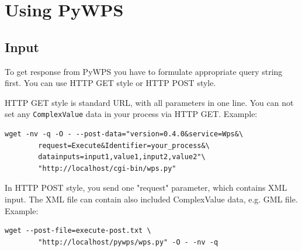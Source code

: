\documentclass[a4paper,11pt]{article}
\begin{document}
\section{Using PyWPS}
\subsection{Input}
    
To get response from PyWPS you have to formulate appropriate query string first. You can use HTTP GET style or HTTP POST style.
    
    
HTTP GET style is standard URL, with all parameters in one line. You can not set any \texttt{ComplexValue} data in your process via HTTP GET. Example:
    
\begin{verbatim}
wget -nv -q -O - --post-data="version=0.4.0&service=Wps&\
        request=Execute&Identifier=your_process&\
        datainputs=input1,value1,input2,value2"\
        "http://localhost/cgi-bin/wps.py"
\end{verbatim}
    
In HTTP POST style, you send one "request" parameter, which contains XML input. The XML file can contain also included ComplexValue data, e.g. GML file. Example:
    
\begin{verbatim}
wget --post-file=execute-post.txt \
        "http://localhost/pywps/wps.py" -O - -nv -q
\end{verbatim}
    
\end{document}
